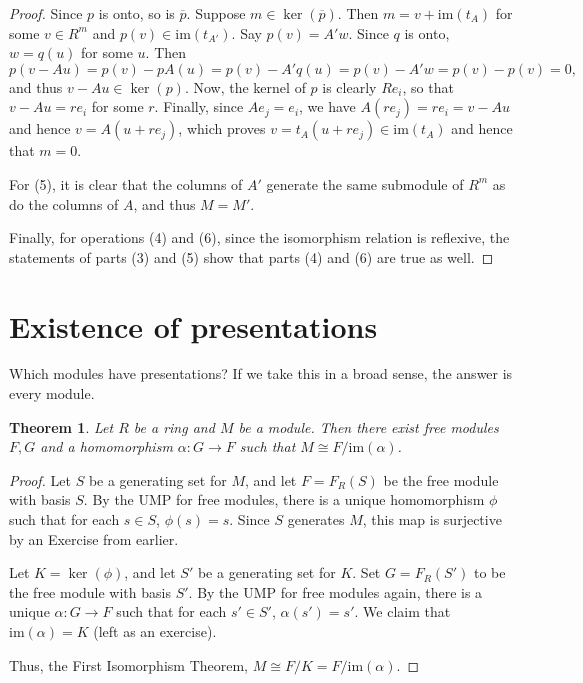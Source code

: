 \documentclass[12pt]{report}
\newtheorem{theorem}{Theorem}[chapter]
\numberwithin{equation}{section}
\numberwithin{theorem}{chapter}
\theoremstyle{definition}
\newtheorem*{basic properties}{Basic Properties}
\newtheorem*{Important Remark}{Important Remark}
\renewcommand{\ker}{\operatorname{ker}}
\begin{document}
\begin{proof}
Since $p$ is onto, so is $\overline{p}$. Suppose $m \in \ker(\overline{p})$. Then $m = v + \mathrm{im}(t_A)$ for some $v \in R^m$ and $p(v) \in \mathrm{im}(t_{A'})$. Say $p(v) = A' w$. Since $q$ is onto, $w = q(u)$ for some $u$. Then
$$p(v - Au) = p(v) - pA(u) = p(v) - A'q(u) = p(v) - A'w = p(v) - p(v) = 0,$$
and thus $v - Au \in \ker(p)$. Now, the kernel of $p$ is
clearly $Re_i$, so that $v - Au = re_i$ for some $r$. Finally, since $Ae_j = e_i$, we have $A(re_j) = re_i = v - Au$ and hence $v = A(u + re_j)$, which proves
$v=t_A(u+re_j) \in \mathrm{im}(t_A)$ and hence that  $m = 0$.

For (5), it is clear that the columns of $A'$ generate the same submodule of $R^m$ as do the columns of $A$, and thus $M = M'$.
  
Finally, for operations (4) and (6), since the isomorphism relation is reflexive, the statements of parts (3) and (5) show that parts (4) and (6) are true as well.
\end{proof}

\section{Existence of presentations}

 
Which modules have presentations? If we take this in a broad sense, the answer is every module.


\begin{theorem}\label{presentation-thm}
Let $R$ be a ring and $M$ be a module. Then there exist free modules $F,G$ and a homomorphism $\alpha\colon G\to F$ such that $M\cong F/ \mathrm{im}(\alpha)$. 
\end{theorem}
\begin{proof}
Let $S$ be a generating set for $M$, and let $F= F_R(S)$ be the free module with basis $S$. By the UMP for free modules, there is a unique homomorphism $\phi$ such that for each $s\in S$, $\phi(s) =s$. Since $S$ generates $M$, this map is surjective by an Exercise from earlier. 

Let $K=\ker(\phi)$, and let $S'$ be a generating set for $K$. Set $G=F_R(S')$ to be the free module with basis $S'$. By the UMP for free modules again, there is a unique $\alpha\colon G\to F$ such that for each $s'\in S'$, $\alpha(s') =s'$. We claim that $\mathrm{im}(\alpha) = K$ (left as an exercise).

Thus, the First Isomorphism Theorem, $M\cong F/K = F/\mathrm{im}(\alpha)$.
\end{proof} 
\end{document}
